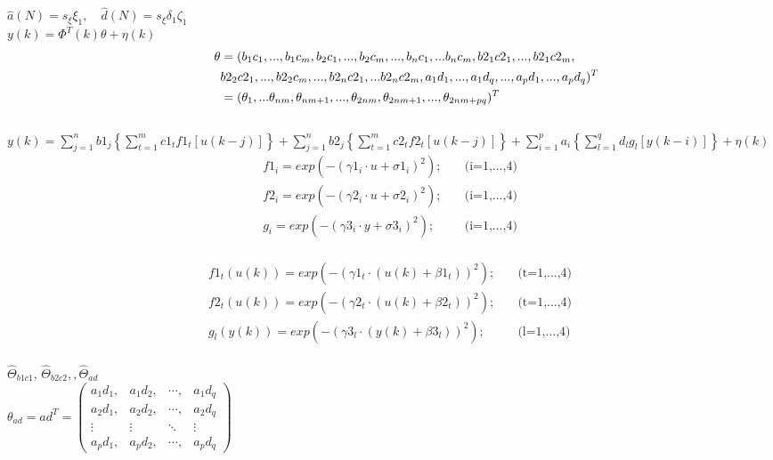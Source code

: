 \documentclass[12pt,a4paper]{report}
\begin{document}
$\hat{a}(N)= s_{\xi } \xi _1, \quad \hat{d}(N)= s_{\xi}\delta  _1\zeta _1$\\

$y(k)=\Phi^T(k)\theta + \eta(k)$\\

\begin{align*}
\theta &=(b_1c_1,...,b_1c_m,b_2c_1,...,b_2c_m,...,b_nc_1,...b_nc_m, b2_1c2_1,...,b2_1c2_m,\\
\indent\indent\,& b2_2c2_1,...,b2_2c_m,...,b2_nc2_1,...b2_nc2_m,a_1d_1,...,a_1d_q,...,a_pd_1,...,a_pd_q)^T\\
&=(\theta _1,...\theta_{nm},\theta_{nm+1},...,\theta_{2nm},\theta_{2nm+1},...,\theta_{2nm+pq})^T
 \end{align*}\\
 
$y(k) =\sum\limits_{j=1}^n b1_j\left \{  \sum\limits_{t=1}^mc1_tf1_t\left [ u(k-j) \right ]\right \}+\sum\limits_{j=1}^n b2_j\left \{\sum\limits_{t=1}^mc2_tf2_t\left [u(k-j) \right ]\right \}+\sum\limits_{i=1}^p a_i\left \{ \sum\limits_{l=1}^qd_lg_l\left [ y(k-i) \right ]\right \} +\eta(k)$\\ 

\begin{align*}
f1_i=exp(-(\gamma1 _{i}\cdot u+\sigma 1_i)^2);\quad  &\text{(i=1,...,4)}\\
f2_i=exp(-(\gamma 2_i\cdot u+\sigma 2_i)^2); \quad   &\text{(i=1,...,4)}\\
g_i=exp(-(\gamma3_i\cdot y+\sigma 3_i)^2); \quad     &\text{(i=1,...,4)}\\
\end{align*}

\begin{align*}
f1_t(u(k))=exp(-(\gamma1 _{t}\cdot( u(k)+\beta 1_t))^2);\quad  &\text{(t=1,...,4)}\\
f2_t(u(k))=exp(-(\gamma 2_t\cdot (u(k)+\beta 2_t))^2); \quad   &\text{(t=1,...,4)}\\
g_l(y(k))=exp(-(\gamma3_l\cdot (y(k)+\beta 3_l))^2); \quad     &\text{(l=1,...,4)}\\
\end{align*}

$\hat{\Theta}_{b1c1},\,\hat{\Theta}_{b2c2},,\hat{\Theta}_{ad}$\\

$\theta_{ad}=ad^T=\begin{pmatrix}
a_1d_1, & a_1d_2, & \cdots , & a_1d_q\\ 
a_2d_1, & a_2d_2, & \cdots, & a_2d_q\\ 
 \vdots &  \vdots & \ddots   &\vdots  \\ 
a_pd_1, & a_pd_2, & \cdots, & a_pd_q
\end{pmatrix}$\\
\end{document}
